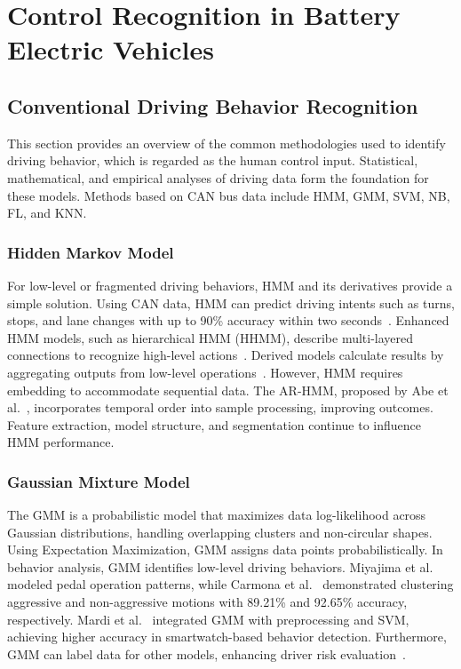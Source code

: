\section{Control Recognition in Battery Electric Vehicles}

\subsection{Conventional Driving Behavior Recognition}

This section provides an overview of the common methodologies used to identify driving behavior, which is regarded as the human control input.
Statistical, mathematical, and empirical analyses of driving data form the foundation for these models. 
Methods based on CAN bus data include \gls{HMM}, \gls{GMM}, \gls{SVM}, \gls{NB}, \gls{FL}, and \gls{KNN}.

\subsubsection{Hidden Markov Model}

For low-level or fragmented driving behaviors, \gls{HMM} and its derivatives provide a simple solution. 
Using CAN data, \gls{HMM} can predict driving intents such as turns, stops, and lane changes with up to 90\% accuracy within two seconds~\cite{tran2015hidden}. 
Enhanced \gls{HMM} models, such as hierarchical \gls{HMM} (\gls{HHMM}), describe multi-layered connections to recognize high-level actions~\cite{fine1998hierarchical, he2012driving}. 
Derived models calculate results by aggregating outputs from low-level operations~\cite{zhu2016driving}. 
However, \gls{HMM} requires embedding to accommodate sequential data. The \gls{AR-HMM}, proposed by Abe et al.~\cite{abe2007study}, 
incorporates temporal order into sample processing, improving outcomes. Feature extraction, model structure, and segmentation continue to influence \gls{HMM} performance.

\subsubsection{Gaussian Mixture Model}

The \gls{GMM} is a probabilistic model that maximizes data log-likelihood across Gaussian distributions, handling overlapping clusters and non-circular shapes. 
Using Expectation Maximization, \gls{GMM} assigns data points probabilistically. 
In behavior analysis, \gls{GMM} identifies low-level driving behaviors. 
Miyajima et al.~\cite{Miyajima2007} modeled pedal operation patterns, while Carmona et al.~\cite{Carmona2016} demonstrated clustering aggressive and non-aggressive motions with 89.21\% and 92.65\% accuracy, respectively. 
Mardi et al.~\cite{Mardi2021} integrated \gls{GMM} with preprocessing and \gls{SVM}, achieving higher accuracy in smartwatch-based behavior detection. 
Furthermore, \gls{GMM} can label data for other models, enhancing driver risk evaluation~\cite{Song2021}.

